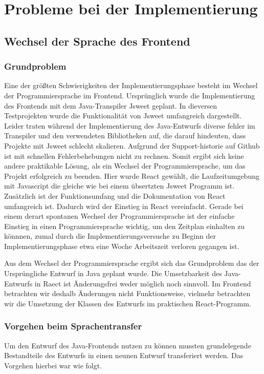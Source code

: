 \section{Probleme bei der Implementierung}

\subsection{Wechsel der Sprache des Frontend}
\subsubsection{Grundproblem}
Eine der größten Schwierigkeiten der Implementierungsphase besteht im Wechsel der Programmiersprache im Frontend.
Ursprünglich wurde die Implementierung des Frontends mit dem Java-Transpiler Jsweet geplant.
In dieversen Testprojekten wurde die Funktionalität von Jsweet umfangreich dargestellt.
Leider traten während der Implementierung des Java-Entwurfs diverse fehler im Transpiler und den verwendeten Bibliotheken auf, die darauf hindeuten, dass Projekte mit Jsweet schlecht skalieren.
Aufgrund der Support-historie auf Github ist mit schnellen Fehlerbehebungen nicht zu rechnen.
Somit ergibt sich keine andere praktikable Lösung, als ein Wechsel der Programmiersprache, um das Projekt erfolgreich zu beenden.
Hier wurde React gewählt, die Laufzeitumgebung mit Javascript die gleiche wie bei einem übsertzten Jsweet Programm ist.
Zusätzlich ist der Funktionsumfang und die Dokumentation von React umfangreich ist.
Dadurch wird der Einstieg in React vereinfacht.
Gerade bei einem derart spontanen Wechsel der Programmiersprache ist der einfache Einstieg in einen Programmiersprache wichtig, um den Zeitplan einhalten zu könnnen, zumal durch die Implementierungsversuche zu Beginn der Implementierungsphase etwa eine Woche Arbeitszeit verloren gegangen ist.

Aus dem Wechsel der Programmiersprache ergibt sich das Grundproblem das der Ursprüngliche Entwurf in Java geplant wurde. Die Umsetzbarkeit des Java-Entwurfs in Raect ist Änderungsfrei weder möglich noch sinnvoll.
Im Frontend betrachten wir deshalb Änderungen nicht Funktionsweise, vielmehr betrachten wir die Umsetzung der Klassen des Entwurfs im praktischen React-Programm.

\subsubsection{Vorgehen beim Sprachentransfer}
Um den Entwurf des Java-Frontends nutzen zu können mussten grundelegende Bestandteile des Entwurfs in einen neunen Entwurf transferiert werden.
Das Vorgehen hierbei war wie folgt.


